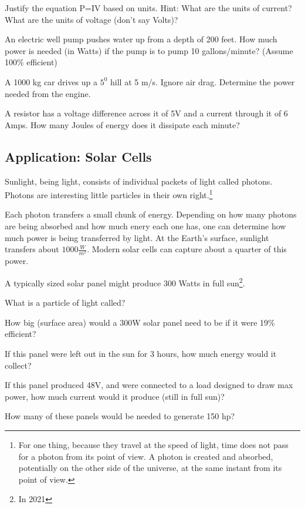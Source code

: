 \begin{blevel}
Justify the equation P=IV based on units. Hint: What are the units of current? What are the units of voltage (don't say Volts)?
\end{blevel}

\begin{clevel}
An electric well pump pushes water up from a depth of 200 feet. How much power is needed (in Watts) if the pump is to pump 10 gallons/minute? (Assume 100\% efficient)
\end{clevel}

\begin{clevel}
A 1000 kg car drives up a $5^0$ hill at 5 m/s. Ignore air drag. Determine the power needed from the engine.
\end{clevel}

\begin{blevel}
A resistor has a voltage difference across it of 5V and a current through it of 6 Amps. How many Joules of energy does it dissipate each minute?
\end{blevel}


\subsection{Application: Solar Cells}
Sunlight, being light, consists of individual packets of light called photons. Photons are interesting little particles in their own right.\footnote{For one thing, because they travel at the speed of light, time does not pass for a photon from its point of view. A photon is created and absorbed, potentially on the other side of the universe, at the same instant from its point of view.}\par

Each photon transfers a small chunk of energy. Depending on how many photons are being absorbed and how much enery each one has, one can determine how much power is being transferred by light. At the Earth's surface, sunlight transfers about $1000 \frac{W}{m^2}$. Modern solar cells can capture about a quarter of this power.

A typically sized solar panel might produce 300 Watts in full sun\footnote{In 2021}.

\begin{alevel}
What is a particle of light called?
\end{alevel}
\begin{blevel}
How big (surface area) would a 300W solar panel need to be if it were 19\% efficient?
\end{blevel}
\begin{blevel}
If this panel were left out in the sun for 3 hours, how much energy would it collect?
\end{blevel}
\begin{blevel}
If this panel produced 48V, and were connected to a load designed to draw max power, how much current would it produce (still in full sun)?
\end{blevel}
\begin{blevel}
How many of these panels would be needed to generate 150 hp?
\end{blevel}

